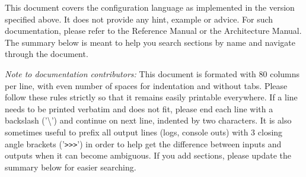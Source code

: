 \maketitle
\tableofcontents
\newpage

This document covers the configuration language as implemented in the version
specified above. It does not provide any hint, example or advice. For such
documentation, please refer to the Reference Manual or the Architecture Manual.
The summary below is meant to help you search sections by name and navigate
through the document.

\emph{Note to documentation contributors:}
This document is formated with 80 columns per line, with even number of
spaces for indentation and without tabs. Please follow these rules strictly
so that it remains easily printable everywhere. If a line needs to be
printed verbatim and does not fit, please end each line with a backslash
('\textbackslash') and continue on next line, indented by two characters. It is also
sometimes useful to prefix all output lines (logs, console outs) with 3
closing angle brackets ('\verb|>>>|') in order to help get the difference between
inputs and outputs when it can become ambiguous. If you add sections,
please update the summary below for easier searching.